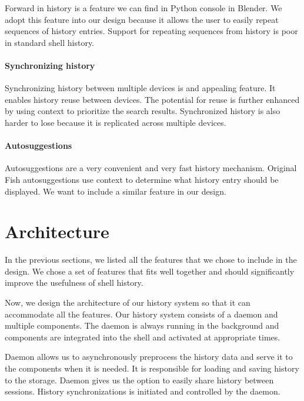 \documentclass[thesis=M,english]{FITthesis}[2012/10/20]
\begin{document}
Forward in history is a feature we can find in Python console in Blender. We adopt this feature into our design because it allows the user to easily repeat sequences of history entries. Support for repeating sequences from history is poor in standard shell history.

\paragraph{Synchronizing history}

Synchronizing history between multiple devices is and appealing feature. It enables history reuse between devices. The potential for reuse is further enhanced by using context to prioritize the search results.
Synchronized history is also harder to lose because it is replicated across multiple devices. 

\paragraph{Autosuggestions}

Autosuggestions are a very convenient and very fast history mechanism. Original Fish autosuggestions use context to determine what history entry should be displayed.
We want to include a similar feature in our design.

\section{Architecture}

In the previous sections, we listed all the features that we chose to include in the design. We chose a set of features that fits well together and should significantly improve the usefulness of shell history.

Now, we design the architecture of our history system so that it can accommodate all the features. 
Our history system consists of a daemon and multiple components. The daemon is always running in the background and components are integrated into the shell and activated at appropriate times. 


Daemon allows us to asynchronously preprocess the history data and serve it to the components when it is needed. It is responsible for loading and saving history to the storage. Daemon gives us the option to easily share history between sessions. History synchronizations is initiated and controlled by the daemon.
\end{document}

